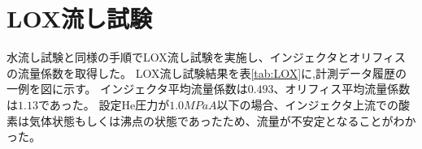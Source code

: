 \section{LOX流し試験}
水流し試験と同様の手順でLOX流し試験を実施し、インジェクタとオリフィスの流量係数を取得した。
LOX流し試験結果を表\ref{tab:LOX}に,計測データ履歴の一例を図に示す。
インジェクタ平均流量係数は$0.493$、オリフィス平均流量係数は$1.13$であった。
設定He圧力が$1.0MPaA$以下の場合、インジェクタ上流での酸素は気体状態もしくは沸点の状態であったため、流量が不安定となることがわかった。
